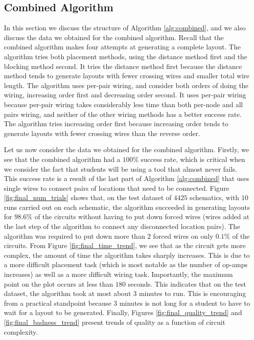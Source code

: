 \subsection{Combined Algorithm}
\label{sec:method_combination}

In this section we discuss the structure of Algorithm
\ref{alg:combined}, and we also
discuss the data we obtained for the combined algorithm. Recall that the combined
algorithm makes four attempts at generating a complete layout. The algorithm
tries both
placement methods, using the distance method first and the blocking method
second. It
tries the distance method first because the distance method tends to
generate layouts with fewer
crossing wires and smaller total wire length. The algorithm uses
per-pair wiring, and
consider both orders of doing the wiring, increasing order first and decreasing
order second. It uses per-pair wiring because per-pair wiring takes considerably
less time than both per-node and all pairs wiring, and neither of the other
wiring methods has a better success rate. The algorithm tries increasing order
first because increasing order tends to generate layouts with fewer crossing
wires than the reverse order.

Let us now consider the data we obtained for the combined algorithm. Firstly, we
see that the combined algorithm had a $100\%$ success rate, which is critical
when we consider the fact that students will be using a tool that almost never
fails. This success rate is a result of the last part of Algorithm
\ref{alg:combined} that uses single wires to connect pairs of locations that
need to be connected.
Figure \ref{fig:final_num_trials} shows that, on the test dataset of $4425$
schematics, with $10$ runs carried out on each schematic, the algorithm succeeded
in generating layouts for $98.6\%$ of the circuits without having to put down
forced wires (wires added at the last step of the algorithm to connect any
disconnected location pairs). The algorithm was
required to put down more than $2$ forced wires on only $0.1\%$ of the circuits.
From Figure
\ref{fig:final_time_trend}, we see that as the circuit gets more complex, the
amount of time the algorithm takes sharply increases. This is due to a more
difficult placement task (which is most notable as the number of op-amps
increases) as well as a more
difficult wiring task. Importantly, the maximum
point on the plot occurs at less than $180$ seconds. This indicates that on the
test dataset, the algorithm took at most about $3$ minutes to run. This is
encouraging from a practical standpoint because $3$ minutes is not long
for a student to have to wait for a layout to be generated.
Finally, Figures \ref{fig:final_quality_trend} and \ref{fig:final_badness_trend}
present trends of quality as a
function of circuit complexity.

